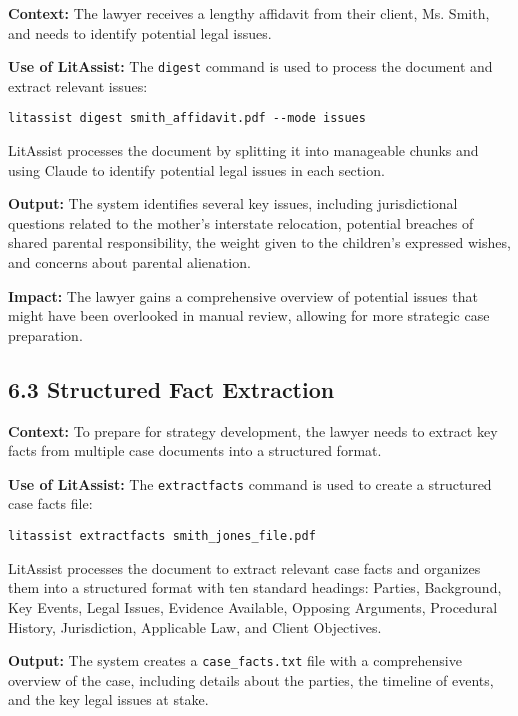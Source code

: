 \documentclass[12pt,a4paper]{article}
\begin{document}
\textbf{Context:} The lawyer receives a lengthy affidavit from their client, Ms. Smith, and needs to identify potential legal issues.

\textbf{Use of LitAssist:} The \texttt{digest} command is used to process the document and extract relevant issues:

\begin{verbatim}
litassist digest smith_affidavit.pdf --mode issues
\end{verbatim}

LitAssist processes the document by splitting it into manageable chunks and using Claude to identify potential legal issues in each section.

\textbf{Output:} The system identifies several key issues, including jurisdictional questions related to the mother's interstate relocation, potential breaches of shared parental responsibility, the weight given to the children's expressed wishes, and concerns about parental alienation.

\textbf{Impact:} The lawyer gains a comprehensive overview of potential issues that might have been overlooked in manual review, allowing for more strategic case preparation.

\subsection*{6.3 Structured Fact Extraction}

\textbf{Context:} To prepare for strategy development, the lawyer needs to extract key facts from multiple case documents into a structured format.

\textbf{Use of LitAssist:} The \texttt{extractfacts} command is used to create a structured case facts file:

\begin{verbatim}
litassist extractfacts smith_jones_file.pdf
\end{verbatim}

LitAssist processes the document to extract relevant case facts and organizes them into a structured format with ten standard headings: Parties, Background, Key Events, Legal Issues, Evidence Available, Opposing Arguments, Procedural History, Jurisdiction, Applicable Law, and Client Objectives.

\textbf{Output:} The system creates a \texttt{case\_facts.txt} file with a comprehensive overview of the case, including details about the parties, the timeline of events, and the key legal issues at stake.
\end{document}

